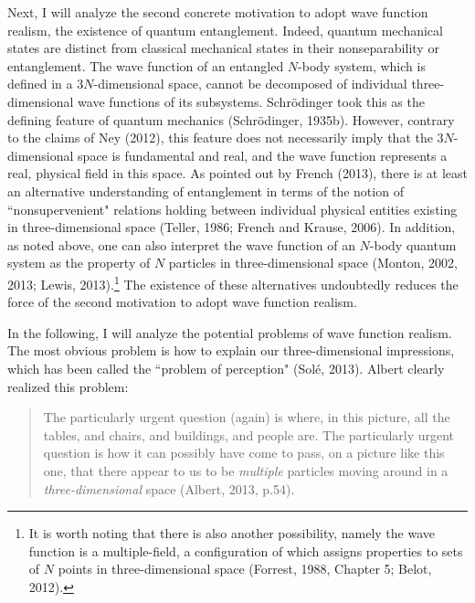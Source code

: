 Next,  I will analyze the second concrete motivation to adopt wave function realism, the existence of quantum entanglement. Indeed, quantum mechanical states are distinct from classical mechanical states in their nonseparability or entanglement. The wave function of an entangled $N$-body system, which is defined in a $3N$-dimensional space, cannot be decomposed of individual  three-dimensional wave functions of its subsystems. Schr\"{o}dinger took this as the defining feature of quantum mechanics (Schr\"{o}dinger, 1935b). %
However, contrary to the claims of Ney (2012), this feature does not necessarily imply that the $3N$-dimensional space is fundamental and real, and the wave function represents a real, physical field in this space. As pointed out by French (2013), there is at least an alternative understanding of entanglement in terms of the notion of ``nonsupervenient" relations holding between individual physical entities existing in three-dimensional space (Teller, 1986; French and Krause, 2006). In addition, as noted above, one can also interpret the wave function of an $N$-body quantum system as the property of $N$ particles in three-dimensional space (Monton, 2002, 2013; Lewis, 2013).\footnote{It is worth noting that there is also another possibility, namely the wave function is a multiple-field, a configuration of which assigns properties to sets of $N$ points in three-dimensional space (Forrest, 1988, Chapter 5; Belot, 2012).} The existence of these alternatives undoubtedly reduces the force of the second motivation to adopt wave function realism.

In the following, I will analyze the potential problems of wave function realism.
The most obvious problem is how to  explain our three-dimensional impressions, which has been called the ``problem of perception" (Sol\'{e}, 2013). Albert clearly realized this problem:

\begin{quote}
The particularly urgent question (again) is where, in this picture, all the tables, and chairs, and buildings, and people are. The particularly urgent question is how it can possibly have come to pass, on a picture like this one, that there appear to us to be \emph{multiple} particles moving around in a  \emph{three-dimensional} space (Albert, 2013, p.54). 
\end{quote}

